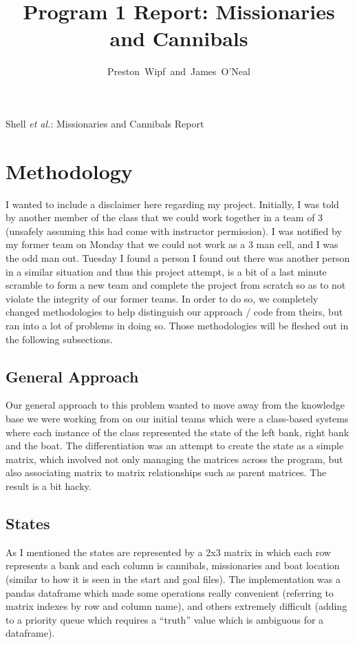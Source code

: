 \documentclass[journal]{IEEEtran}
\begin{document}
\onecolumn

\title{Program 1 Report: Missionaries and Cannibals}
\author{Preston~Wipf~and~James~O'Neal}%

%
{Shell \MakeLowercase{\textit{et al.}}: Missionaries and Cannibals Report}

\maketitle

\section{Methodology}
\noindent I wanted to include a disclaimer here regarding my project. Initially, 
I was told by another member of the class that we could work together in a team
of 3 (unsafely assuming this had come with instructor permission). I was notified
by my former team on Monday that we could not work as a 3 man cell, and I was the odd 
man out. Tuesday I found a person I found out there was another person in a similar
situation and thus this project attempt, is a bit of a last minute scramble to form a
new team and complete the project from scratch so as to not violate the integrity of 
our former teams. In order to do so, we completely changed methodologies to help 
distinguish our approach / code from theirs, but ran into a lot of problems in doing so. 
Those methodologies will be fleshed out in the following subsections. \\

\subsection{General Approach}
\noindent Our general approach to this problem wanted to move away from the knowledge
base we were working from on our initial teams which were a class-based systems
where each instance of the class represented the state of the left bank, right bank
and the boat. The differentiation was an attempt to create the state as a simple matrix,
which involved not only managing the matrices across the program, but also
associating matrix to matrix relationships such as parent matrices. The result is a 
bit hacky. \medskip

\subsection{States}
\noindent As I mentioned the states are represented by a 2x3 matrix in which each 
row represents a bank and each column is cannibals, missionaries and boat location
(similar to how it is seen in the start and goal files). The implementation was a 
pandas dataframe which made some operations really convenient (referring to matrix
indexes by row and column name), and others extremely difficult (adding to a priority 
queue which requires a ``truth'' value which is ambiguous for a dataframe).\smallskip
\end{document}
